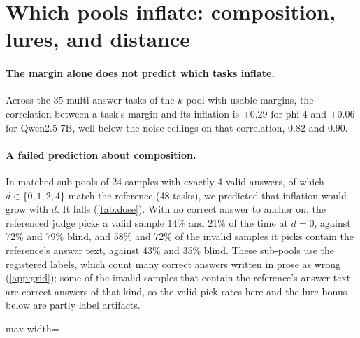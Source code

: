 \section{Which pools inflate: composition, lures, and distance}
\label{app:composition}

\paragraph{The margin alone does not predict which tasks inflate.}
Across the 35 multi-answer tasks of the $k$-pool with usable margins, the correlation between a task's margin and its inflation is $+0.29$ for phi-4 and $+0.06$ for Qwen2.5-7B, well below the noise ceilings on that correlation, $0.82$ and $0.90$.

\paragraph{A failed prediction about composition.}
In matched sub-pools of 24 samples with exactly 4 valid answers, of which $d \in \{0,1,2,4\}$ match the reference (48 tasks), we predicted that inflation would grow with $d$. It falls (\cref{tab:dose}). With no correct answer to anchor on, the referenced judge picks a valid sample 14\% and 21\% of the time at $d{=}0$, against 72\% and 79\% blind, and 58\% and 72\% of the invalid samples it picks contain the reference's answer text, against 43\% and 35\% blind. These sub-pools use the registered labels, which count many correct answers written in prose as wrong (\cref{app:grid}); some of the invalid samples that contain the reference's answer text are correct answers of that kind, so the valid-pick rates here and the lure bonus below are partly label artifacts.

\begin{table}[htbp]
\centering
\caption{Added inflation by the number $d$ of valid samples matching the reference (\sd, 95\% CI).\pre}
\label{tab:dose}
\footnotesize
\begin{adjustbox}{max width=\linewidth}\end{adjustbox}

\end{table}

